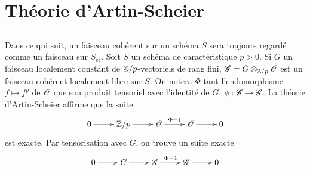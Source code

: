 \section{Th\'eorie d'Artin-Scheier}\label{III:3}





\subsection{}\label{III:3-1}

Dans ce qui suit, un faisceau coh\'erent sur un sch\'ema $S$ sera toujours 
regard\'e comme un faisceau sur $S_\text{\'et}$. Soit $S$ un sch\'ema de 
caract\'eristique $p>0$. Si $G$ un faisceau localement constant de 
$\mathbb{Z}/p$-vectoriels de rang fini, $\mathscr{G}=G\otimes_{\mathbb{Z}/p}\mathscr{O}$ est un faisceau 
coh\'erent localement libre sur $S$. On notera $\Phi$ tant l'endomorphisme 
$f\mapsto f^p$ de $\mathscr{O}$ que son produit tensoriel avec l'identit\'e de 
$G$: $\phi:\mathscr{G}\to\mathscr{G}$. La th\'eorie d'Artin-Scheier \cite[IX 3.5]{sga4} 
affirme que la suite 
\[\xymatrix{
  0 \ar[r] 
    & \dZ/p \ar[r] 
    & \cO \ar[r]^-{\Phi-1} 
    & \cO \ar[r] 
    & 0
}\]
est exacte. Par tensorisation avec $G$, on trouve un suite exacte 
\[\xymatrix{
  0 \ar[r] 
    & G \ar[r] 
    & \cG \ar[r]^-{\Phi-1} 
    & \cG \ar[r] 
    & 0
}\]
